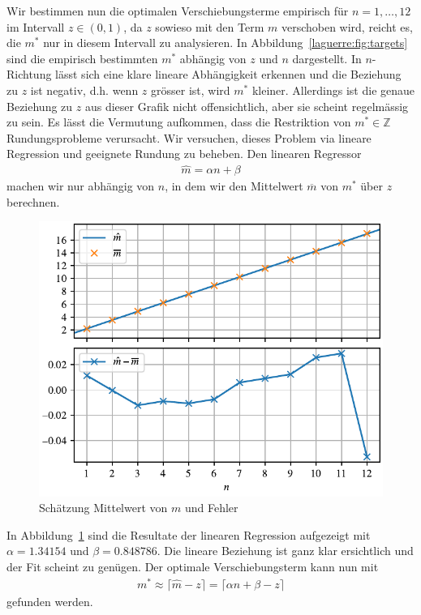 Wir bestimmen nun die optimalen Verschiebungsterme empirisch
für $n = 1,\ldots, 12$ im Intervall $z \in (0, 1)$,
da $z$ sowieso mit den Term $m$ verschoben wird,
reicht es,
die $m^*$ nur in diesem Intervall zu analysieren.
In Abbildung~\ref{laguerre:fig:targets} sind die empirisch bestimmten $m^*$
abhängig von $z$ und $n$ dargestellt.
In $n$-Richtung lässt sich eine klare lineare Abhängigkeit erkennen und
die Beziehung zu $z$ ist negativ,
d.h. wenn $z$ grösser ist, wird $m^*$ kleiner.
Allerdings ist die genaue Beziehung zu $z$
aus dieser Grafik nicht offensichtlich,
aber sie scheint regelmässig zu sein.
Es lässt die Vermutung aufkommen,
dass die Restriktion von $m^* \in \mathbb{Z}$ Rundungsprobleme verursacht.
Wir versuchen,
dieses Problem via lineare Regression und geeignete Rundung zu beheben.
Den linearen Regressor
%
\begin{align*}
\hat{m}
=
\alpha n + \beta
\end{align*}
machen wir nur abhängig von $n$,
in dem wir den Mittelwert $\overline{m}$ von $m^*$ über $z$ berechnen.

\begin{figure}
\centering
% 
\includegraphics{papers/laguerre/images/estimates.pdf}
\caption{Schätzung Mittelwert von $m$ und Fehler}
\label{laguerre:fig:schaetzung}
\end{figure}

In Abbildung~\ref{laguerre:fig:schaetzung} sind die Resultate
der linearen Regression aufgezeigt mit $\alpha = 1.34154$ und $\beta =
0.848786$.
Die lineare Beziehung ist ganz klar ersichtlich und der Fit scheint zu genügen.
Der optimale Verschiebungsterm kann nun mit
\begin{align*}
m^*
\approx
\lceil \hat{m} - z \rceil
=
\lceil \alpha n + \beta - z \rceil
\end{align*}
gefunden werden.

